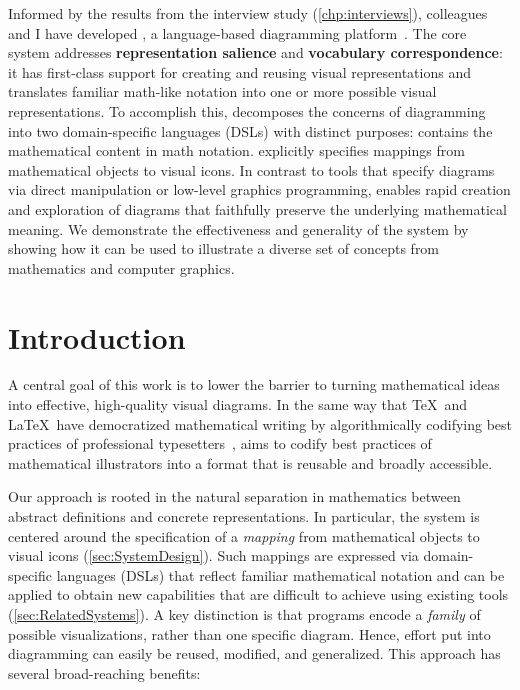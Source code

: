 Informed by the results from the interview study (\cref{chp:interviews}), colleagues and I have developed \Penrose, a language-based diagramming platform~\cite{penrose}. The core \Penrose system addresses \textbf{representation salience} and \textbf{vocabulary correspondence}: it has first-class support for creating and reusing visual representations and translates familiar math-like notation into one or more possible visual representations. To accomplish this, \Penrose decomposes the concerns of diagramming into two domain-specific languages (DSLs) with distinct purposes: \colorbox[HTML]{E7F3E7}{\Substance} contains the mathematical content in math notation. \colorbox[HTML]{DDDEED}{\Style} explicitly specifies mappings from mathematical objects to visual icons. In contrast to tools that specify diagrams via direct manipulation or low-level graphics programming, \Penrose{} enables rapid creation and exploration of diagrams that faithfully preserve the underlying mathematical meaning.  We demonstrate the effectiveness and generality of the system by showing how it can be used to illustrate a diverse set of concepts from mathematics and computer graphics.

\section{Introduction}
\label{sec:Introduction}

A central goal of this work is to lower the barrier to turning mathematical ideas into effective, high-quality visual diagrams.  In the same way that \TeX\ and \LaTeX\ have democratized mathematical writing by algorithmically codifying best practices of professional typesetters~\cite{Beeton:2016:CMT}, \Penrose{} aims to codify best practices of mathematical illustrators into a format that is reusable and broadly accessible.

Our approach is rooted in the natural separation in mathematics between abstract definitions and concrete representations. In particular, the \Penrose{} system is centered around the specification of a \emph{mapping} from mathematical objects to visual icons (\cref{sec:SystemDesign}).  Such mappings are expressed via domain-specific languages (DSLs) that reflect familiar mathematical notation and can be applied to obtain new capabilities that are difficult to achieve using existing tools (\cref{sec:RelatedSystems}).  A key distinction is that \Penrose{} programs encode a \emph{family} of possible visualizations, rather than one specific diagram.  Hence, effort put into diagramming can easily be reused, modified, and generalized.  This approach has several broad-reaching benefits:

